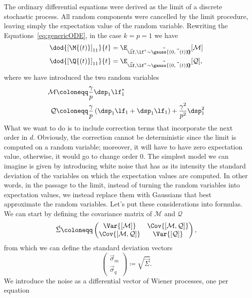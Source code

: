 The ordinary differential equations were derived as the limit of a discrete stochastic process.
All random components were cancelled by the limit procedure, leaving simply the expectation value of the random variable.
Rewriting the Equations~\eqref{eq:genericODE}, in the case \(k=p=1\) we have 
\[\begin{split}
  \dod{\left[\M{\left(t\right)}\right]_{11}}{t} &=\E_{\vec{\lf},\vec{\lf^* \sim \gauss{(0,\vec{\Omega}{(t)})}}}{\left[\mathcal{M}\right]} \\
  \dod{\left[\Q{\left(t\right)}\right]_{11}}{t} &=\E_{\vec{\lf},\vec{\lf^* \sim \gauss{(0,\vec{\Omega}{(t)})}}}{\left[\mathcal{Q}\right]},
\end{split}\]
where we have introduced the two random variables
\[\begin{split}
  \mathcal{M} \coloneqq &  \frac{\gamma}{p} \dsp_1 \lf_1^* \\
  \mathcal{Q} \coloneqq &  \frac{\gamma}{p}\left(\dsp_1 \lf_1 + \dsp_1 \lf_1\right) + \frac{\gamma^2}{p^2} \dsp_1^2
\end{split}\]
What we want to do is to include correction terms that incorporate the next order in \(d\).
Obviously, the correction cannot be deterministic since the limit is computed on a random variable;
moreover, it will have to have zero expectation value, otherwise, it would go to change order 0.
The simplest model we can imagine is given by introducing white noise that has as its intensity the standard deviation of the variables on which the expectation values are computed.
In other words, in the passage to the limit, instead of turning the random variables into expectation values,
we instead replace them with Gaussians that best approximate the random variables.
Let's put these considerations into formulas. We can start by defining the covariance matrix of \(\mathcal{M}\)
and \(\mathcal{Q}\)
\[
  \vec{\Sigma} \coloneqq 
  \begin{pmatrix}
    \Var{\left[\mathcal{M}\right]} & \Cov{\left[\mathcal{M},\mathcal{Q}\right]} \\
    \Cov{\left[\mathcal{M},\mathcal{Q}\right]} & \Var{\left[\mathcal{Q}\right]}
  \end{pmatrix},
\]
from which we can define the standard deviation vectors
\[
  \begin{pmatrix}
    \vec{\sigma}_m \\
    \vec{\sigma}_q
  \end{pmatrix}
  \coloneqq
  \sqrt{\vec{\Sigma}}.
\]
We introduce the noise as a differential vector of Wiener processes, one per equation
